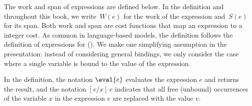 \begin{cluster}
\label{grp:def:analysis::models::pml}

\begin{definition}
\label{def:analysis::models::pml}
The work and span of \PML{} expressions are defined below.
In the definition and throughout this book, we write~$W(e)$ for the
work of the expression and~$S(e)$ for its span. 
Both work and span are cost functions that map an expression to a
integer cost.
As common in language-based models, the definition follows the
definition of expressions for \PML{} (). 
We make one simplifying assumption in the presentation: instead of
considering general bindings, we only consider the case where a single
variable is bound to the value of the expression.

In the definition, the notation $\eval{e}$ evaluates the expression
$e$ and returns the result, and the notation $[v/x]~e$ indicates that
all free (unbound) occurrences of the variable $x$ in the expression
$e$ are replaced with the value $v$.


\end{definition}
\end{cluster}
